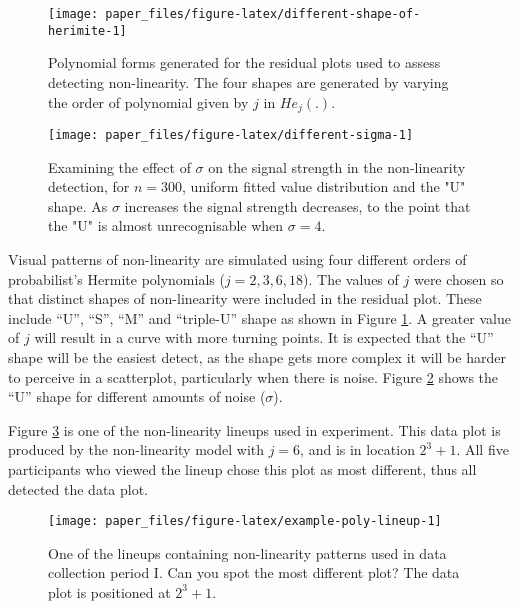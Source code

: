 \documentclass[]{interact}
\theoremstyle{plain}%
\theoremstyle{definition}
\theoremstyle{remark}
\begin{document}
\begin{figure}[!h]

{\centering \texttt{[image: paper\_files/figure-latex/different-shape-of-herimite-1]} 

}

\caption{Polynomial forms generated for the residual plots used to assess detecting non-linearity. The four shapes are generated by varying the order of polynomial given by $j$ in $He_j(.)$.}\label{fig:different-shape-of-herimite}
\end{figure}

\begin{figure}[!h]

{\centering \texttt{[image: paper\_files/figure-latex/different-sigma-1]} 

}

\caption{Examining the effect of $\sigma$ on the signal strength in the non-linearity detection, for $n=300$, uniform fitted value distribution and the "U" shape. As $\sigma$ increases the signal strength decreases, to the point that the "U" is almost unrecognisable when $\sigma=4$.}\label{fig:different-sigma}
\end{figure}

Visual patterns of non-linearity are simulated using four different
orders of probabilist's Hermite polynomials (\(j = 2, 3, 6, 18\)). The
values of \(j\) were chosen so that distinct shapes of non-linearity
were included in the residual plot. These include ``U'', ``S'', ``M''
and ``triple-U'' shape as shown in Figure
\ref{fig:different-shape-of-herimite}. A greater value of \(j\) will
result in a curve with more turning points. It is expected that the
``U'' shape will be the easiest detect, as the shape gets more complex
it will be harder to perceive in a scatterplot, particularly when there
is noise. Figure \ref{fig:different-sigma} shows the ``U'' shape for
different amounts of noise (\(\sigma\)).

Figure \ref{fig:example-poly-lineup} is one of the non-linearity lineups
used in experiment. This data plot is produced by the non-linearity
model with \(j = 6\), and is in location \(2^3+1\). All five
participants who viewed the lineup chose this plot as most different,
thus all detected the data plot.

\begin{figure}[t!]

{\centering \texttt{[image: paper\_files/figure-latex/example-poly-lineup-1]} 

}

\caption{One of the lineups containing non-linearity patterns used in data collection period I. Can you spot the most different plot? The data plot is positioned at $2^3 + 1$.}\label{fig:example-poly-lineup}
\end{figure}
\end{document}
